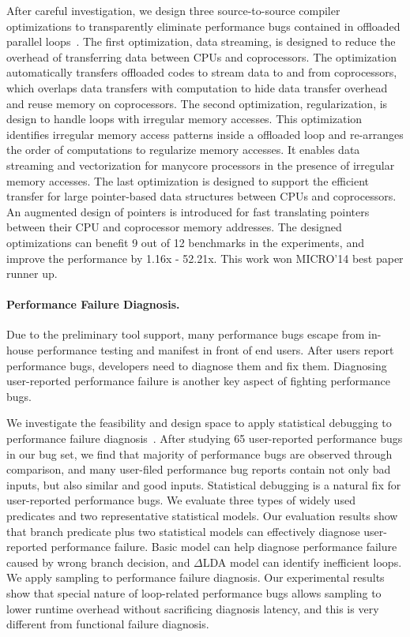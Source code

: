 \documentclass[10pt]{article}
\begin{document}
After careful investigation, we design three source-to-source compiler optimizations to 
transparently eliminate performance bugs contained in offloaded parallel loops~\cite{Song14MICRO}. 
The first optimization, data streaming, is designed to reduce the overhead of transferring data between CPUs and coprocessors. 
The optimization automatically transfers offloaded codes to stream data to and from coprocessors, which overlaps data transfers 
with computation to hide data transfer overhead and reuse memory on coprocessors. 
The second optimization, regularization, is design to handle loops with irregular memory accesses. 
This optimization identifies irregular memory access patterns inside a offloaded loop and re-arranges the order of computations to regularize memory accesses. 
It enables data streaming and vectorization for manycore processors in the presence of irregular memory accesses. 
The last optimization is designed to support the efficient transfer for large pointer-based data structures between CPUs and coprocessors. 
An augmented design of pointers is introduced for fast translating pointers between their CPU and coprocessor memory addresses. 
The designed optimizations can benefit 9 out of 12 benchmarks in the experiments, and improve the performance by 1.16x - 52.21x. 
This work won MICRO'14 best paper runner up. 




\paragraph{Performance Failure Diagnosis.}

Due to the preliminary tool support, many performance bugs escape from in-house performance testing and manifest in front of end users. 
After users report performance bugs, developers need to diagnose them and fix them.
Diagnosing user-reported performance failure is another key aspect of fighting performance bugs. 

We investigate the feasibility and design space to apply statistical debugging to performance failure diagnosis~\cite{Song14OOPSLA}.
After studying 65 user-reported performance bugs in our bug set, 
we find that majority of performance bugs are observed through comparison, 
and many user-filed performance bug reports contain not only bad inputs, but also similar and good inputs.
Statistical debugging is a natural fix for user-reported performance bugs. 
We evaluate three types of widely used predicates and two representative statistical models. 
Our evaluation results show that branch predicate plus two statistical models can effectively diagnose user-reported performance failure. 
Basic model can help diagnose performance failure caused by wrong branch decision, and $\Delta $LDA model can identify inefficient loops.  
We apply sampling to performance failure diagnosis. Our experimental results show that
special nature of loop-related performance bugs allows sampling to lower runtime overhead without sacrificing diagnosis latency, 
and this is very different from functional failure diagnosis.
\end{document}
